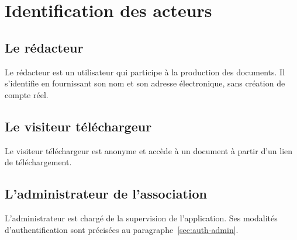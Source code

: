 \chapter{Identification des acteurs}

\section{Le rédacteur}
Le rédacteur est un utilisateur qui participe à la production des documents. Il s'identifie en fournissant son nom et son adresse électronique, sans création de compte réel.

\section{Le visiteur téléchargeur}
Le visiteur téléchargeur est anonyme et accède à un document à partir d'un lien de téléchargement.

\section{L'administrateur de l'association}
L'administrateur est chargé de la supervision de l'application. Ses modalités d'authentification sont précisées au paragraphe~\ref{sec:auth-admin}.

